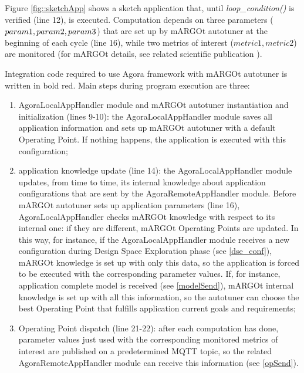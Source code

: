 Figure \ref{fig::sketchApp} shows a sketch application that, until \textit{loop\_con\-di\-tion()} is verified (line 12), is executed. Computation depends on three parameters ($pa\-ram1, pa\-ram2, pa\-ram3$) that are set up by mARGOt autotuner at the beginning of each cycle (line 16), while two metrics of interest ($metric1, metric2$) are monitored (for mARGOt details, see related scientific publication \cite{gadioli2015application}).

Integration code required to use Agora framework with mARGOt autotuner is written in bold red. Main steps during program execution are three:

\begin{enumerate}

    \item AgoraLocalAppHandler module and mARGOt autotuner instantiation and initialization (lines 9-10): the AgoraLocalAppHandler module saves all application information and sets up mARGOt autotuner with a default Operating Point. If nothing happens, the application is executed with this configuration;
    
    \item application knowledge update (line 14): the AgoraLocalAppHandler module updates, from time to time, its internal knowledge about application configurations that are sent by the AgoraRemoteAppHandler module. Before mARGOt autotuner sets up application parameters (line 16), AgoraLocalAppHandler checks mARGOt knowledge with respect to its internal one: if they are different, mARGOt Operating Points are updated. In this way, for instance, if the AgoraLocalAppHandler module receives a new configuration during Design Space Exploration phase (see \ref{dse_conf}), mARGOt knowledge is set up with only this data, so the application is forced to be executed with the corresponding parameter values. If, for instance, application complete model is received (see \ref{modelSend}), mARGOt internal knowledge is set up with all this information, so the autotuner can choose the best Operating Point that fulfills application current goals and requirements;
    
    \item Operating Point dispatch (line 21-22): after each computation has done, parameter values just used with the corresponding monitored metrics of interest are published on a predetermined MQTT topic, so the related AgoraRemoteAppHandler module can receive this information (see \ref{opSend}).
    
\end{enumerate}
